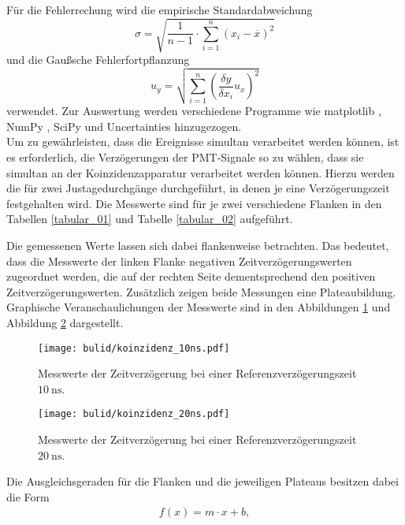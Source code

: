 \noindent Für die Fehlerrechung wird die empirische Standardabweichung
\begin{equation}
  \sigma = \sqrt{\frac{1}{n-1} \cdot \sum_{i=1}^n(x_i-\overline{x})^2}
  \label{eqn:Stdabweichung}
\end{equation}
und die Gaußsche Fehlerfortpflanzung
\begin{equation}
  u_y = \sqrt{\sum_{i=1}^n\left(\frac{\delta y}{\delta x_i}u_x\right)^2}
  \label{eqn:gauß}
\end{equation}
verwendet. Zur Auswertung werden verschiedene Programme wie matplotlib
\cite{matplotlib}, NumPy \cite{numpy}, SciPy \cite{scipy} und Uncertainties
\cite{uncertainties} hinzugezogen. \\
\newline
\noindent Um zu gewährleisten, dass die Ereignisse simultan verarbeitet werden
können, ist es erforderlich, die Verzögerungen der PMT-Signale so zu wählen, dass
sie simultan an der Koinzidenzapparatur verarbeitet werden können. Hierzu werden
die für zwei Justagedurchgänge durchgeführt, in denen je eine Verzögerungszeit
festgehalten wird. Die Messwerte sind für je zwei verschiedene Flanken in den
Tabellen \ref{tabular_01} und Tabelle \ref{tabular_02} aufgeführt. \\
\FloatBarrier

\FloatBarrier
\FloatBarrier

\FloatBarrier
\noindent Die gemessenen Werte lassen sich dabei flankenweise betrachten. Das
bedeutet, dass die Messwerte der linken Flanke negativen Zeitverzögerungswerten
zugeordnet werden, die auf der rechten Seite dementsprechend den positiven
Zeitverzögerungswerten. Zusätzlich zeigen beide Messungen eine Plateaubildung.
Graphische Veranschaulichungen der Messwerte sind in den Abbildungen \ref{fig:04}
und Abbildung \ref{fig:05} dargestellt.
\FloatBarrier
\begin{figure}
  \centering
  \texttt{[image: bulid/koinzidenz\_10ns.pdf]}
  \caption{Messwerte der Zeitverzögerung bei einer Referenzverzögerungszeit $\SI{10}{\nano\second}$.}
  \label{fig:04}
\end{figure}
\FloatBarrier
\FloatBarrier
\begin{figure}
  \centering
  \texttt{[image: bulid/koinzidenz\_20ns.pdf]}
  \caption{Messwerte der Zeitverzögerung bei einer Referenzverzögerungszeit $\SI{20}{\nano\second}$.}
  \label{fig:05}
\end{figure}
\FloatBarrier
\noindent Die Ausgleichsgeraden für die Flanken und die jeweiligen Plateaus
besitzen dabei die Form
\begin{align}
  f(x) = m \cdot x + b,
  \label{eqn:08}
\end{align}
